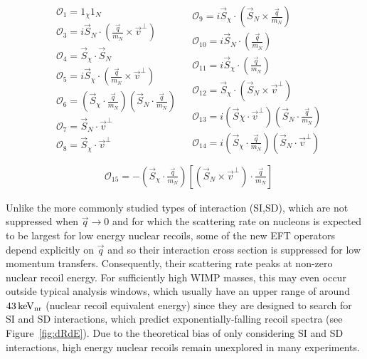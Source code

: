 \begingroup
\belowdisplayskip=0pt
\begin{align*}
\begin{split} 
&\mathcal{O}_1 = 1_{\chi} 1_N  \\
&\mathcal{O}_3 = i\vec{S}_N\cdot (\frac{\vec{q}}{m_N}\times\vec{v}^\perp) \\
&\mathcal{O}_4 = \vec{S}_{\chi}\cdot \vec{S}_N \\
&\mathcal{O}_5 = i\vec{S}_{\chi}\cdot (\frac{\vec{q}}{m_N}\times\vec{v}^\perp) \\
&\mathcal{O}_6 = (\vec{S}_{\chi} \cdot \frac{\vec{q}}{m_N})(\vec{S}_N \cdot \frac{\vec{q}}{m_N}) \\
&\mathcal{O}_7 = \vec{S}_N \cdot \vec{v}^\perp \\
&\mathcal{O}_8 = \vec{S}_{\chi} \cdot \vec{v}^\perp  \\
\end{split}
\begin{split}
&\mathcal{O}_9 = i\vec{S}_{\chi} \cdot(\vec{S}_N \times \frac{\vec{q}}{m_N}) \\
&\mathcal{O}_{10} = i\vec{S}_N \cdot (\frac{\vec{q}}{m_N}) \\
&\mathcal{O}_{11} = i\vec{S}_{\chi} \cdot (\frac{\vec{q}}{m_N}) \\
&\mathcal{O}_{12} = \vec{S}_\chi \cdot (\vec{S}_N \times \vec{v}^\perp) \\
&\mathcal{O}_{13} = i(\vec{S}\chi \cdot \vec{v}^\perp)(\vec{S}_N \cdot \frac{\vec{q}}{m_N})\\
&\mathcal{O}_{14} = i(\vec{S}_\chi \cdot \frac{\vec{q}}{m_N})(\vec{S}_N \cdot \vec{v}^\perp) \\
\end{split}
\end{align*}
\endgroup
\begingroup
\abovedisplayskip=0pt
\begin{align}
&\mathcal{O}_{15} = -(\vec{S}_\chi \cdot \frac{\vec{q}}{m_N})\left[(\vec{S}_N \times \vec{v}^\perp)\cdot \frac{\vec{q}}{m_N}\right]
\label{eq:OpDef}
\end{align}
\endgroup

Unlike the more commonly studied types of interaction (SI,SD), which are not suppressed when $\vec{q} \rightarrow 0$ and for which the scattering rate on nucleons is expected to be largest for low energy nuclear recoils, some of the new EFT operators depend explicitly on $\vec{q}$ and so their interaction cross section is suppressed for low momentum transfers. Consequently, their scattering rate peaks at non-zero nuclear recoil energy. For sufficiently high WIMP masses, this may even occur outside typical analysis windows, which usually have an upper range of around $ 43\,\mathrm{keV_\mathrm{nr}}$ (nuclear recoil equivalent
energy) since they are designed to search for SI and SD interactions, which predict exponentially-falling recoil spectra (see Figure~\ref{fig:dRdE}). Due to the theoretical bias of only considering SI and SD interactions, high energy nuclear recoils remain unexplored in many experiments.
	    
